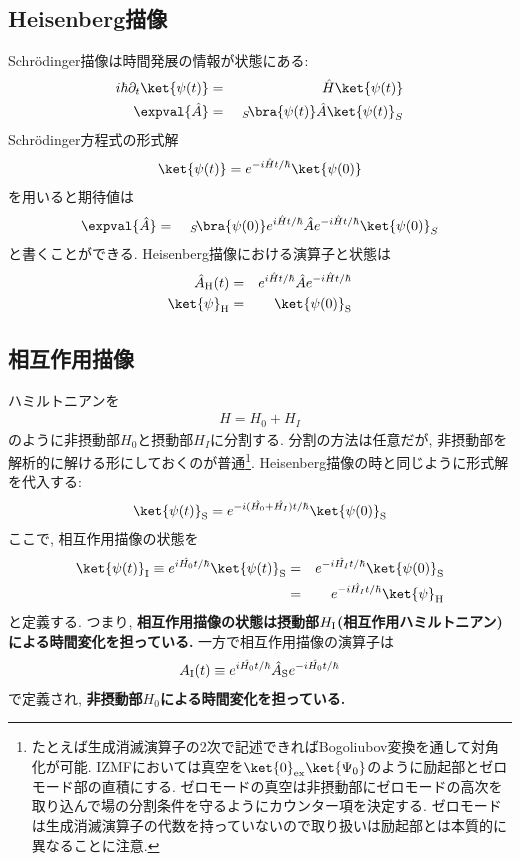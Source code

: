 \documentclass[10.5pt,a4paper]{jreport}
\begin{document}
\subsection{Heisenberg描像}
Schr\"odinger描像は時間発展の情報が状態にある:
\begin{eqnarray}
  i\hbar\partial_t\ket{\psi(t)} &=& \hat{H}\ket{\psi(t)}\\
  \expval{\hat{A}} &=&\ _S\!\bra{\psi(t)}\hat{A}\ket{\psi(t)}_S
\end{eqnarray}
Schr\"odinger方程式の形式解
\begin{eqnarray}
  \ket{\psi(t)} = e^{-i\hat{H}t/\hbar}\ket{\psi(0)}
\end{eqnarray}
を用いると期待値は
\begin{eqnarray}
  \expval{\hat{A}} &=&\ _S\!\bra{\psi(0)}e^{i\hat{H}t/\hbar}\hat{A}e^{-i\hat{H}t/\hbar}\ket{\psi(0)}_S
\end{eqnarray}
と書くことができる. Heisenberg描像における演算子と状態は
\begin{eqnarray}
  \hat{A}_{\rm H}(t) &=& e^{i\hat{H}t/\hbar}\hat{A}e^{-i\hat{H}t/\hbar}\\
  \ket{\psi}_{\rm H} &=&  \ket{\psi(0)}_{\rm S}
\end{eqnarray}
\subsection{相互作用描像}
ハミルトニアンを
\begin{eqnarray}
  H = H_0 + H_I
\end{eqnarray}
のように非摂動部$H_0$と摂動部$H_I$に分割する. 分割の方法は任意だが, 非摂動部を解析的に解ける形にしておくのが普通\footnote{たとえば生成消滅演算子の2次で記述できればBogoliubov変換を通して対角化が可能. IZMFにおいては真空を$\ket{0}_{\rm ex}\ket{\Psi_0}$のように励起部とゼロモード部の直積にする. ゼロモードの真空は非摂動部にゼロモードの高次を取り込んで場の分割条件を守るようにカウンター項を決定する. ゼロモードは生成消滅演算子の代数を持っていないので取り扱いは励起部とは本質的に異なることに注意. }. Heisenberg描像の時と同じように形式解を代入する:
\begin{eqnarray}
  \ket{\psi(t)}_{\rm S} = e^{-i(\hat{H_0} + \hat{H_I})t/\hbar}\ket{\psi(0)}_{\rm S}
\end{eqnarray}
ここで, 相互作用描像の状態を
\begin{eqnarray}
  \ket{\psi(t)}_{\rm I} \equiv e^{i\hat{H_0}t/\hbar}\ket{\psi(t)}_{\rm S} &=& e^{-i\hat{H_I}t/\hbar}\ket{\psi(0)}_{\rm S}\\
  &=& e^{-i\hat{H_I}t/\hbar}\ket{\psi}_{\rm H}
\end{eqnarray}
と定義する. つまり, \textbf{相互作用描像の状態は摂動部$H_{\rm I}$(相互作用ハミルトニアン)による時間変化を担っている. }一方で相互作用描像の演算子は
\begin{eqnarray}
  A_{\rm I}(t) \equiv e^{i\hat{H_0}t/\hbar}\hat{A}_{\rm S}e^{-i\hat{H_0}t/\hbar}
\end{eqnarray}
で定義され, \textbf{非摂動部$H_0$による時間変化を担っている. }
\end{document}
